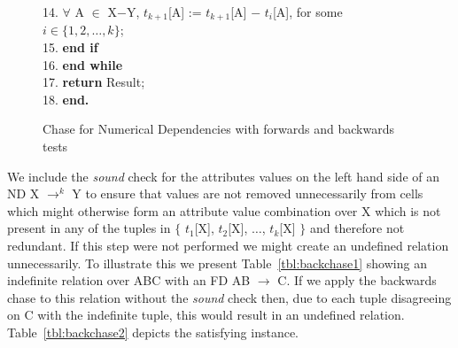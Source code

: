 {\begin{figure}[ht]
{\begin{minipage}{14cm}
\begin{algorithm}[{\rm ND\_CHASE}($r$, {\rm N})]
\begin{rm}
\begin{tabbing}
14. \> \> \> \> \>  $\forall$ A $\in$ X$-$Y,  $t_{k+1}$[A] := $t_{k+1}$[A] $-$ $t_i$[A], for some $i \in \{1,2,\ldots,k\}$; \\
15. \> \> \> \> {\bf end if}\\
16.  \> \> \> {\bf end while} \\
17. \> \> \> {\bf return} Result;  \\
18. \> \> {\bf end.}
\end{tabbing}
\end{rm}
\end{algorithm}
\end{minipage}}
\caption{\label{cp:fig:indef_chase} Chase for Numerical Dependencies with forwards and backwards tests}
\end{figure}
}

We include the {\em sound} check for the attributes values on the left
hand side of an ND \linebreak X $\to^k$ Y to ensure that values are not removed
unnecessarily 
from cells which might otherwise form an attribute value combination over X
which is not present in any of the tuples in $\{$ $t_1$[X], $t_2$[X],
$\ldots$, $t_k$[X] $\}$ and therefore not redundant. If this step were
not performed we might 
create an undefined relation unnecessarily. To illustrate this we
present Table~\ref{tbl:backchase1} showing an indefinite relation over
ABC with an FD AB $\to$ C. If we apply the backwards chase to this
relation without the {\em sound} check then, due to each tuple
disagreeing on C with the indefinite tuple, this would result in an undefined
relation. Table~\ref{tbl:backchase2} depicts the satisfying instance.

